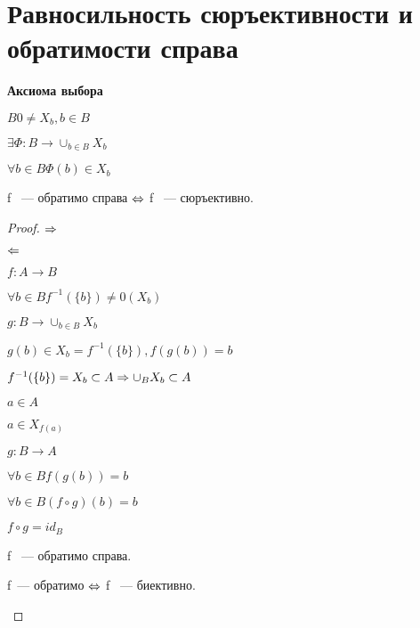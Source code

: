 ﻿\section{Равносильность сюръективности и обратимости справа}

{\bf Аксиома выбора}

$B 0 \ne X_b, b \in B$

$\exists \Phi: B \to \cup_{b \in B}X_b$

$\forall b \in B \Phi(b) \in X_{b}$

\begin{theorem}{}

f ~--- обратимо справа $\Leftrightarrow$ f ~--- сюръективно.

\end{theorem}

\begin{proof}
$\Rightarrow$

$\Leftarrow$

$f: A \to B$

$\forall b \in B f^{-1}(\{b\}) \ne 0(X_b)$

$g: B \to \cup_{b \in B}X_b$

$g(b) \in X_b = f^{-1}(\{b\}), f(g(b))= b$

$f^{-1}(\{b\}) = X_b \subset A \Rightarrow \cup_{B} X_b \subset A$

$a \in A$

$a \in X_{f(a)}$

$g: B \to A$

$\forall b \in B f(g(b)) = b$

$\forall b \in B (f \circ g)(b) = b$

$f \circ g = id_{B}$

f ~--- обратимо справа.

\begin{conseq}{}

f~--- обратимо $\Leftrightarrow$ f ~--- биективно.

\end{conseq}
\end{proof}